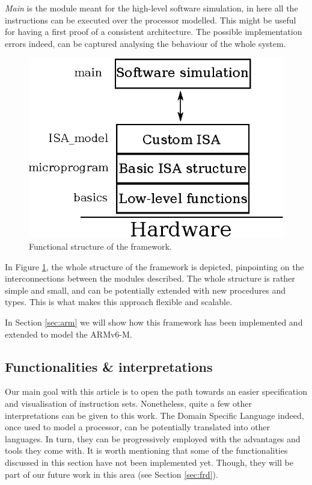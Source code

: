 \documentclass[conference]{IEEEtran}
\begin{document}
\textit{Main} is the module meant for the high-level software simulation, in here
all the instructions can be executed over the processor modelled. This might be useful
for having a first proof of a consistent architecture. The possible implementation errors
indeed, can be captured analysing the behaviour of the whole system.

\begin{figure}[ht!]
\begin{center}
	\includegraphics[scale=1]{IMG/structure.eps}
	\caption{Functional structure of the framework.}
	\label{fig:structure}
\end{center}
\end{figure}

In Figure \ref{fig:structure}, the whole structure of the framework is depicted, pinpointing 
on the interconnections between the modules described. The whole structure is rather simple
and small, and can be potentially extended with new procedures and types. This is what makes
this approach flexible and scalable.

In Section \ref{sec:arm} we will show how this framework has been implemented and extended
to model the ARMv6-M.

\subsection{Functionalities \& interpretations}
\label{sec:func}
Our main goal with this article is to open the path towards an easier specification and
visualisation of instruction sets. Nonetheless, quite a few other interpretations can be
given to this work. The Domain Specific Language indeed, once used to model
a processor, can be potentially translated into other languages. In turn, they
can be progressively employed with the advantages and tools they come with. It is worth
mentioning that some of the functionalities discussed in this section have not been
implemented yet. Though, they will be part of our future work in this area (see Section
\ref{sec:frd}).
\end{document}
